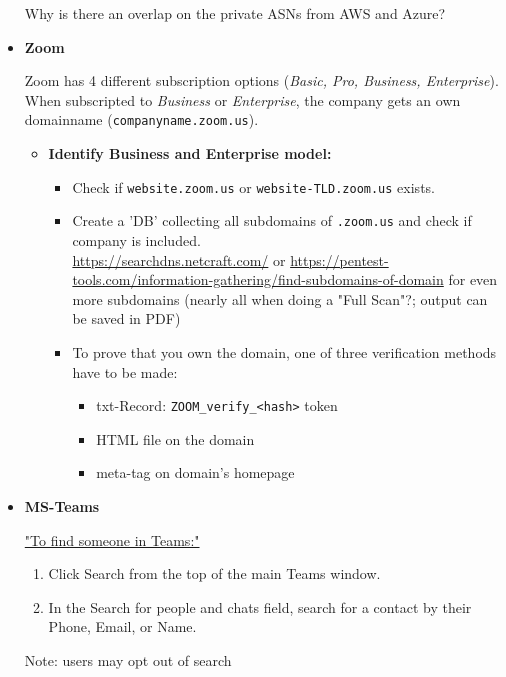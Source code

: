 \documentclass[12pt]{article}
\begin{document}
\begin{itemize}
    Why is there an overlap on the private ASNs from AWS and Azure?
    
    
    
    \item \textbf{Zoom}
    
    Zoom has 4 different subscription options (\textit{Basic, Pro, Business, Enterprise}). When subscripted to \textit{Business} or \textit{Enterprise}, the company gets an own domainname (\verb|companyname.zoom.us|).
    
    \begin{itemize}
        \item \textbf{Identify Business and Enterprise model:} 
        \begin{itemize}
            \item Check if \verb|website.zoom.us| or \verb|website-TLD.zoom.us| exists.
            \item Create a 'DB' collecting all subdomains of \verb|.zoom.us| and check if company is included.\\
            \url{https://searchdns.netcraft.com/} or \url{https://pentest-tools.com/information-gathering/find-subdomains-of-domain} for even more subdomains (nearly all when doing a "Full Scan"?; output can be saved in PDF)
            \item To prove that you own the domain, one of three verification methods have to be made:
            \begin{itemize}
                \item txt-Record: \verb|ZOOM_verify_<hash>| token
                \item HTML file on the domain
                \item meta-tag on domain's homepage
            \end{itemize}
        \end{itemize}
    \end{itemize}
    
    
    \item \textbf{MS-Teams}
    
    
    \href{https://support.microsoft.com/en-us/office/find-your-friends-and-family-in-teams-711bfcef-9e40-49d5-8df7-ee071a048c91#ID0EACAAA=Desktop}{"To find someone in Teams:"}
    \begin{enumerate}
        \item Click Search from the top of the main Teams window.
        \item In the Search for people and chats field, search for a contact by their Phone, Email, or Name.
    \end{enumerate}
    Note: users may opt out of search
    

\end{itemize}
\end{document}
